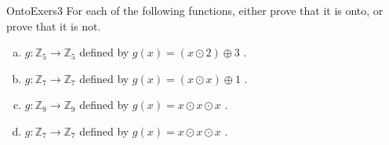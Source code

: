 \begin{exercise}{OntoExers3}
For each of the following  functions, either prove that it is onto, or prove that it is not.
\begin{enumerate}[(a)]
\item \label{modular_m3}
 $g \colon {\mathbb Z}_5 \to {\mathbb Z}_{5}$ defined by $g(x) =  (x \odot 2) \oplus 3$ .
\item 
 $g \colon {\mathbb Z}_7 \to {\mathbb Z}_7$ defined by $g(x)= (x \odot x) \oplus 1 $ .
\item 
 $g \colon {\mathbb Z}_9 \to {\mathbb Z}_9$ defined by $g(x)= x \odot x \odot x$ .
\item 
 $g \colon {\mathbb Z}_7 \to {\mathbb Z}_7$ defined by $g(x)= x \odot x \odot x$ .
\end{enumerate}
\end{exercise}



